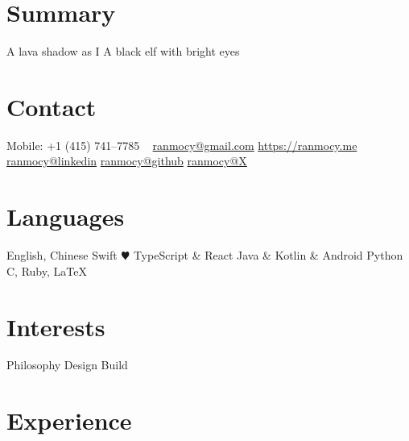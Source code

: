 \documentclass[]{friggeri-cv} %
\begin{document}


\begin{aside} %
  \section{Summary}
  A lava shadow as I
  A black elf
  with bright eyes
  \section{Contact}
  Mobile:
  +1 (415) 741--7785
  ~
  \href{mailto:ranmocy+cv@gmail.com}{ranmocy@gmail.com}
  \href{https://ranmocy.me}{https://ranmocy.me}
  \href{https://www.linkedin.com/in/ranmocy}{ranmocy@linkedin}
  \href{https://github.com/ranmocy}{ranmocy@github}
  \href{https://twitter.com/ranmocy}{ranmocy@X}
  \section{Languages}
  English, Chinese
  Swift {\color{red} $\varheartsuit$}
  TypeScript \& React
  Java \& Kotlin \& Android
  Python
  C, Ruby, LaTeX
  \section{Interests}
  Philosophy
  Design
  Build
\end{aside}


\section{Experience}
\end{document}
